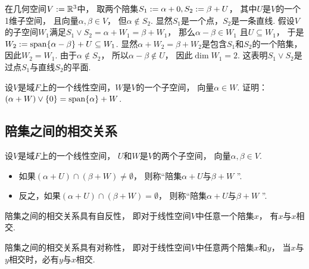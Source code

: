 \begin{example}
在几何空间\(V := \mathbb{R}^3\)中，
取两个陪集\(
	S_1 := \alpha + 0,
	S_2 := \beta + U
\)，
其中\(U\)是\(V\)的一个1维子空间，
且向量\(\alpha,\beta \in V\)，
但\(\alpha \notin S_2\).
显然\(S_1\)是一个点，\(S_2\)是一条直线.
假设\(V\)的子空间\(W_1\)满足\(
	S_1 \vee S_2
	= \alpha + W_1
	= \beta + W_1
\)，
那么\(\alpha - \beta \in W_1\)
且\(U \subseteq W_1\)，
于是\(
	W_2
	\allowbreak
	:= \operatorname{span}\{\alpha - \beta\} + U
	\allowbreak
	\subseteq W_1
\).
显然\(\alpha + W_2 = \beta + W_2\)是包含\(S_1\)和\(S_2\)的一个陪集，
因此\(W_2 = W_1\).
由于\(\alpha \notin S_2\)，
所以\(\alpha - \beta \notin U\)，
因此\(\dim W_1 = 2\).
这表明\(S_1 \vee S_2\)是过点\(S_1\)与直线\(S_2\)的平面.
\end{example}

\begin{example}
设\(V\)是域\(F\)上的一个线性空间，\(W\)是\(V\)的一个子空间，
向量\(\alpha \in W\).
证明：\((\alpha + W) \vee \{0\} = \operatorname{span}\{\alpha\} + W\).
\end{example}

\subsection{陪集之间的相交关系}
\begin{definition}
设\(V\)是域\(F\)上的一个线性空间，
\(U\)和\(W\)是\(V\)的两个子空间，
向量\(\alpha,\beta \in V\).
\begin{itemize}
	\item 如果\((\alpha + U) \cap (\beta + W) \neq \emptyset\)，
	则称“陪集\(\alpha + U\)与\(\beta + W\) ”.

	\item 反之，如果\((\alpha + U) \cap (\beta + W) = \emptyset\)，
	则称“陪集\(\alpha + U\)与\(\beta + W\) ”.
\end{itemize}
\end{definition}

\begin{property}
陪集之间的相交关系具有自反性，
即对于线性空间\(V\)中任意一个陪集\(x\)，
有\(x\)与\(x\)相交.
\end{property}

\begin{property}
陪集之间的相交关系具有对称性，
即对于线性空间\(V\)中任意两个陪集\(x\)和\(y\)，
当\(x\)与\(y\)相交时，必有\(y\)与\(x\)相交.
\end{property}

